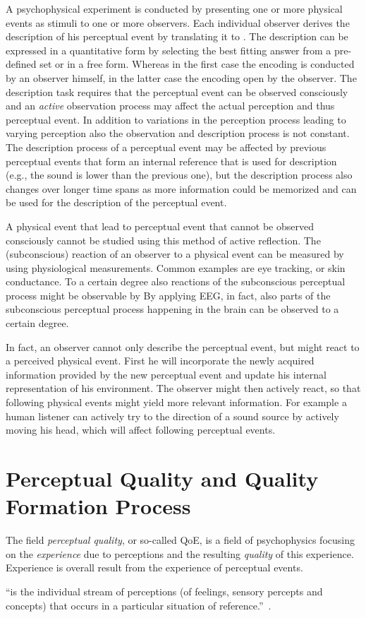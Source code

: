 A psychophysical experiment is conducted by presenting one or more physical events as stimuli to one or more observers.
Each individual observer derives the description of his perceptual event by translating it to .
The description can be expressed in a quantitative form by selecting the best fitting answer from a pre-defined set or in a free form.
Whereas in the first case the encoding is conducted by an observer himself, in the latter case the encoding open by the observer.
The description task requires that the perceptual event can be observed consciously and an \emph{active} observation process may affect the actual perception and thus perceptual event.%
In addition to variations in the perception process leading to varying perception also the observation and description process is not constant.
The description process of a perceptual event may be affected by previous perceptual events that form an internal reference that is used for description (e.g., the sound is lower than the previous one), but the description process also changes over longer time spans as more information could be memorized and can be used for the description of the perceptual event.

A physical event that lead to perceptual event that cannot be observed consciously cannot be studied using this method of active reflection.
The (subconscious) reaction of an observer to a physical event can be measured by using physiological measurements.
Common examples are eye tracking, or skin conductance.
To a certain degree also reactions of the subconscious perceptual process might be observable by 
By applying \ac{EEG}, in fact, also parts of the subconscious perceptual process happening in the brain can be observed to a certain degree.

In fact, an observer cannot only describe the perceptual event, but might react to a perceived physical event.
First he will incorporate the newly acquired information provided by the new perceptual event and update his internal representation of his environment.
The observer might then actively react, so that following physical events might yield more relevant information.
For example a human listener can actively try to the direction of a sound source by actively moving his head, which will affect following perceptual events.

\section{Perceptual Quality and Quality Formation Process}
The field \emph{perceptual quality}, or so-called \ac{QoE}, is a field of psychophysics focusing on the \emph{experience} due to perceptions and the resulting \emph{quality} of this experience.
Experience is overall result from the experience of perceptual events.
\begin{definition}[Experiencing]
``is the individual stream of perceptions (of feelings, sensory percepts and concepts) that occurs in a particular situation of reference.''~\citep[p. 13]{moller_quality_2014}.
\end{definition}

